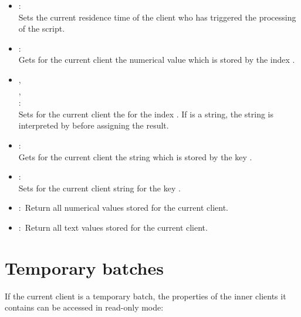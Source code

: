 \begin{itemize}
\item
{}:\\
Sets the current residence time of the client who has triggered the processing of the script.
  
\item
{}:\\
Gets for the current client the numerical value which is stored by the index .
  
\item
{},\\
,\\
:\\
Sets for the current client the  for the index .
If  is a string, the string is interpreted by
 before assigning the result.
  
\item
{}:\\
Gets for the current client the string which is stored by the key .
  
\item
{}:\\
Sets for the current client string  for the key .

\item
{}:\
Return all numerical values stored for the current client.
  
\item
{}:\
Return all text values stored for the current client.
	
\end{itemize}

\section{Temporary batches}

If the current client is a temporary batch, the properties of the inner clients
it contains can be accessed in read-only mode:

